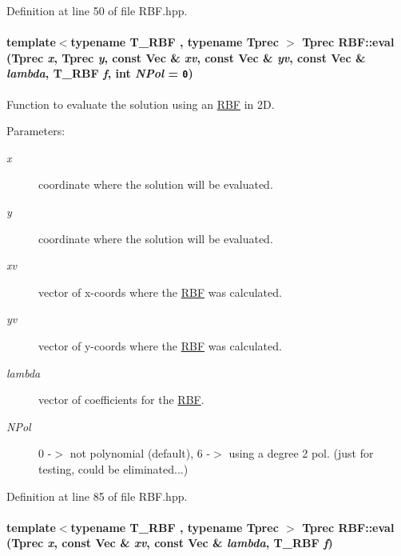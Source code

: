 Definition at line 50 of file RBF.hpp.\hypertarget{namespaceRBF_59f05545d25b48ba53a9d121978d5dcb}{
\paragraph[{eval}]{\setlength{\rightskip}{0pt plus 5cm}template$<$typename T\_\-RBF , typename Tprec $>$ Tprec RBF::eval (Tprec {\em x}, \/  Tprec {\em y}, \/  const {\bf Vec} \& {\em xv}, \/  const {\bf Vec} \& {\em yv}, \/  const {\bf Vec} \& {\em lambda}, \/  T\_\-RBF {\em f}, \/  int {\em NPol} = {\tt 0})}\hfill}
\label{namespaceRBF_59f05545d25b48ba53a9d121978d5dcb}


Function to evaluate the solution using an \hyperlink{namespaceRBF}{RBF} in 2D. 

\begin{Desc}
\item[Parameters:]
\begin{description}
\item[{\em x}]coordinate where the solution will be evaluated. \item[{\em y}]coordinate where the solution will be evaluated. \item[{\em xv}]vector of x-coords where the \hyperlink{namespaceRBF}{RBF} was calculated. \item[{\em yv}]vector of y-coords where the \hyperlink{namespaceRBF}{RBF} was calculated. \item[{\em lambda}]vector of coefficients for the \hyperlink{namespaceRBF}{RBF}. \item[{\em NPol}]0 -$>$ not polynomial (default), 6 -$>$ using a degree 2 pol. (just for testing, could be eliminated...) \end{description}
\end{Desc}


Definition at line 85 of file RBF.hpp.\hypertarget{namespaceRBF_84e5cac73b8f80123c491d4629eec4fb}{
\paragraph[{eval}]{\setlength{\rightskip}{0pt plus 5cm}template$<$typename T\_\-RBF , typename Tprec $>$ Tprec RBF::eval (Tprec {\em x}, \/  const {\bf Vec} \& {\em xv}, \/  const {\bf Vec} \& {\em lambda}, \/  T\_\-RBF {\em f})}\hfill}
\label{namespaceRBF_84e5cac73b8f80123c491d4629eec4fb}


